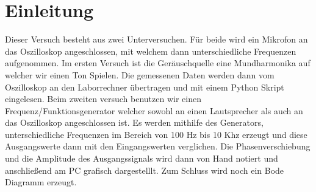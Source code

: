 \documentclass[TGAI_Laborbericht.tex]{subfiles}
\begin{document}
\chapter{Einleitung}
\label{chap:EINL}
\pagestyle{plain}

Dieser Versuch besteht aus zwei Unterversuchen. Für beide wird ein Mikrofon an das Oszilloskop angeschlossen, mit welchem dann unterschiedliche Frequenzen aufgenommen. Im ersten Versuch ist die Geräuschquelle eine Mundharmonika auf welcher wir einen Ton Spielen. Die gemessenen Daten werden dann vom Oszilloskop an den Laborrechner übertragen und mit einem Python Skript eingelesen. Beim zweiten versuch benutzen wir einen Frequenz/Funktionsgenerator welcher sowohl an einen Lautsprecher als auch an das Oszilloskop angeschlossen ist. Es werden mithilfe des Generators, unterschiedliche Frequenzen im Bereich von 100 Hz bis 10 Khz erzeugt und diese Ausgangswerte dann mit den Eingangswerten verglichen. Die Phasenverschiebung und die Amplitude des Ausgangssignals wird dann von Hand notiert und anschließend am PC grafisch dargestelllt. Zum Schluss wird noch ein Bode Diagramm erzeugt.
\end{document}
